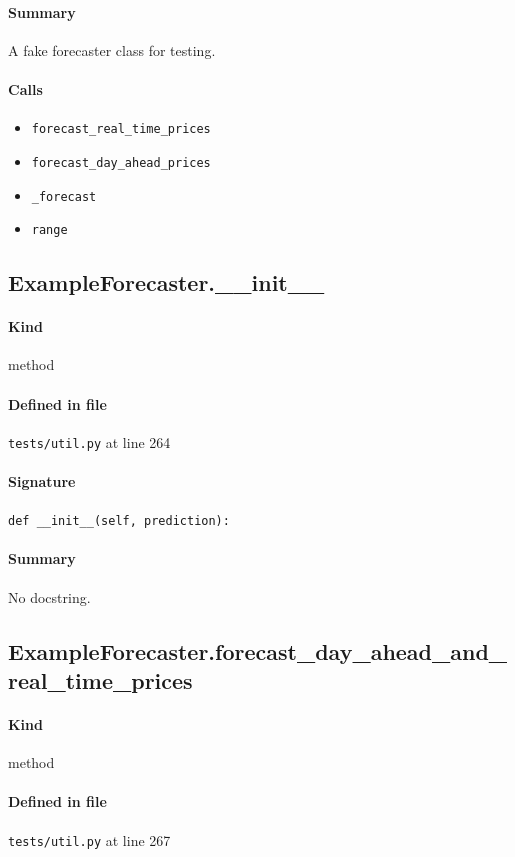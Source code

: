 \documentclass[11pt]{report}
\begin{document}
\paragraph{Summary} A fake forecaster class for testing.
\paragraph{Calls}
\begin{itemize}[leftmargin=*]
  \item \texttt{forecast\_real\_time\_prices}
  \item \texttt{forecast\_day\_ahead\_prices}
  \item \texttt{\_forecast}
  \item \texttt{range}
\end{itemize}
\subsection{ExampleForecaster.\_\_init\_\_}
\label{def:tests-util.py:ExampleForecaster.__init__:L264}
\paragraph{Kind} method
\paragraph{Defined in file} \texttt{tests/util.py} at line 264
\paragraph{Signature} \texttt{def \_\_init\_\_(self, prediction):}
\paragraph{Summary} No docstring.
\subsection{ExampleForecaster.forecast\_day\_ahead\_and\_real\_time\_prices}
\label{def:tests-util.py:ExampleForecaster.forecast_day_ahead_and_real_time_prices:L267}
\paragraph{Kind} method
\paragraph{Defined in file} \texttt{tests/util.py} at line 267
\end{document}
